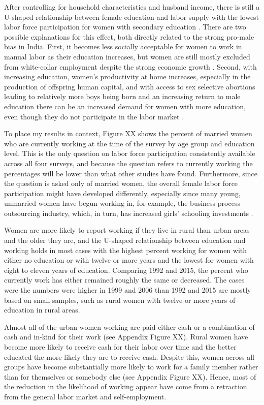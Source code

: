 After controlling for household characteristics and husband income, there is
still a U-shaped relationship between female education and labor supply with the
lowest labor force participation for women with secondary education \citep{Chatterjee2018}.
There are two possible explanations for this effect, both directly related to the strong
pro-male bias in India.
First, it becomes less socially acceptable for women to work in manual labor as their
education increases, but women are still mostly excluded from white-collar
employment despite the strong economic growth \citep{Klasen2015,Chatterjee2018}.
Second, with increasing education, women's productivity at home increases, especially
in the production of offspring human capital, and with access to sex selective abortions
leading to relatively more boys being born and an increasing return to male education 
there can be an increased demand for women with more education, even though they do not 
participate in the labor market \citep{Behrman1999}.


To place my results in context, Figure XX shows the percent of married women who are 
currently working at the time of the survey by age group and education level.
This is the only question on labor force participation consistently available 
across all four surveys, and because the question refers to currently working the 
percentages will be lower than what other studies have found.
Furthermore, since the question is asked only of married women, the overall female labor 
force participation might have developed differently, especially since many young, 
unmarried women have begun working in, for example, the business process 
outsourcing industry, which, in turn, has increased girls' schooling investments
\citep{Jensen2012}.

Women are more likely to report working if they live in rural than urban areas
and the older they are, and the U-shaped relationship between education and working
holds in most cases with the highest percent working for women with either no education
or with twelve or more years and the lowest for women with eight to eleven years 
of education.
Comparing 1992 and 2015, the percent who currently work has either remained roughly 
the same or decreased.
The cases were the numbers were higher in 1999 and 2006 than 1992 and 2015 are mostly
based on small samples, such as rural women with twelve or more years of education
in rural areas.

Almost all of the urban women working are paid either cash or a combination of
cash and in-kind for their work (see Appendix Figure XX).
Rural women have become more likely to receive cash for their labor over time and
the better educated the more likely they are to receive cash.
Despite this, women across all groups have become substantially more likely to 
work for a family member rather than for themselves or somebody else
(see Appendix Figure XX).
Hence, most of the reduction in the likelihood of working appear have come from 
a retraction from the general labor market and self-employment.

